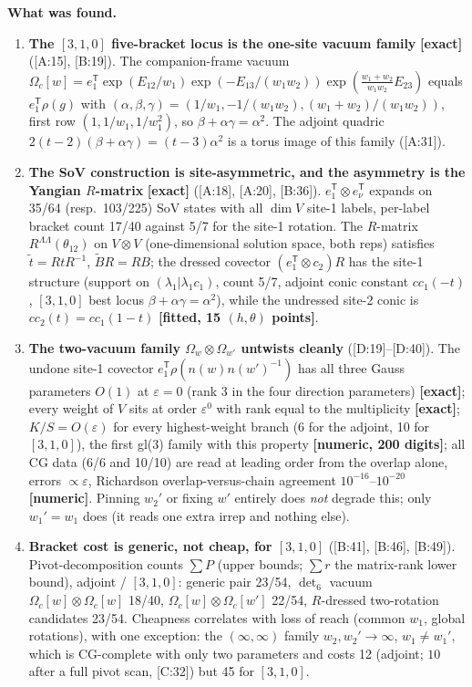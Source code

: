 \documentclass[10pt]{article}
\newcommand{\cl}[2]{\textsf{[#1:#2]}}
\newcommand{\tg}[1]{\textbf{[#1]}}
\newcommand{\Om}{\Omega}
\begin{document}
\textbf{What was found.}
\begin{enumerate}\setlength{\itemsep}{1pt}
\item \textbf{The $[3,1,0]$ five-bracket locus is the one-site vacuum family} \tg{exact} (\cl{A}{15}, \cl{B}{19}). The companion-frame vacuum $\Om_c[w]=e_1^{\mathsf T}\exp(E_{12}/w_1)\exp(-E_{13}/(w_1w_2))\exp(\tfrac{w_1+w_2}{w_1w_2}E_{23})$ equals $e_1^{\mathsf T}\rho(g)$ with $(\alpha,\beta,\gamma)=(1/w_1,-1/(w_1w_2),(w_1+w_2)/(w_1w_2))$, first row $(1,1/w_1,1/w_1^2)$, so $\beta+\alpha\gamma=\alpha^2$. The adjoint quadric $2(t-2)(\beta+\alpha\gamma)=(t-3)\alpha^2$ is a torus image of this family (\cl{A}{31}).
\item \textbf{The SoV construction is site-asymmetric, and the asymmetry is the Yangian $R$-matrix} \tg{exact} (\cl{A}{18}, \cl{A}{20}, \cl{B}{36}). $e_1^{\mathsf T}\otimes e_\nu^{\mathsf T}$ expands on 35/64 (resp.\ 103/225) SoV states with all $\dim V$ site-1 labels, per-label bracket count 17/40 against 5/7 for the site-1 rotation. The $R$-matrix $R^{\Lambda\Lambda}(\theta_{12})$ on $V\otimes V$ (one-dimensional solution space, both reps) satisfies $\tilde t=RtR^{-1}$, $\tilde BR=RB$; the dressed covector $(e_1^{\mathsf T}\otimes c_2)R$ has the site-1 structure (support on $(\lambda_1|\lambda_1c_1)$, count 5/7, adjoint conic constant $cc_1(-t)$, $[3,1,0]$ best locus $\beta+\alpha\gamma=\alpha^2$), while the undressed site-2 conic is $cc_2(t)=cc_1(1-t)$ \tg{fitted, 15 $(h,\theta)$ points}.
\item \textbf{The two-vacuum family $\Om_w\otimes\Om_{w'}$ untwists cleanly} (\cl{D}{19}--\cl{D}{40}). The undone site-1 covector $e_1^{\mathsf T}\rho(n(w)n(w')^{-1})$ has all three Gauss parameters $O(1)$ at $\varepsilon=0$ (rank 3 in the four direction parameters) \tg{exact}; every weight of $V$ sits at order $\varepsilon^0$ with rank equal to the multiplicity \tg{exact}; $K/S=O(\varepsilon)$ for every highest-weight branch (6 for the adjoint, 10 for $[3,1,0]$), the first gl(3) family with this property \tg{numeric, 200 digits}; all CG data (6/6 and 10/10) are read at leading order from the overlap alone, errors $\propto\varepsilon$, Richardson overlap-versus-chain agreement $10^{-16}$--$10^{-20}$ \tg{numeric}. Pinning $w_2'$ or fixing $w'$ entirely does \emph{not} degrade this; only $w_1'=w_1$ does (it reads one extra irrep and nothing else).
\item \textbf{Bracket cost is generic, not cheap, for $[3,1,0]$} (\cl{B}{41}, \cl{B}{46}, \cl{B}{49}). Pivot-decomposition counts $\sum P$ (upper bounds; $\sum r$ the matrix-rank lower bound), adjoint / $[3,1,0]$: generic pair 23/54, $\det_6$ vacuum $\Om_c[w]\otimes\Om_c[w]$ 18/40, $\Om_c[w]\otimes\Om_c[w']$ 22/54, $R$-dressed two-rotation candidates 23/54. Cheapness correlates with loss of reach (common $w_1$, global rotations), with one exception: the $(\infty,\infty)$ family $w_2,w_2'\to\infty$, $w_1\neq w_1'$, which is CG-complete with only two parameters and costs 12 (adjoint; $10$ after a full pivot scan, \cl{C}{32}) but 45 for $[3,1,0]$.

\end{enumerate}
\end{document}
